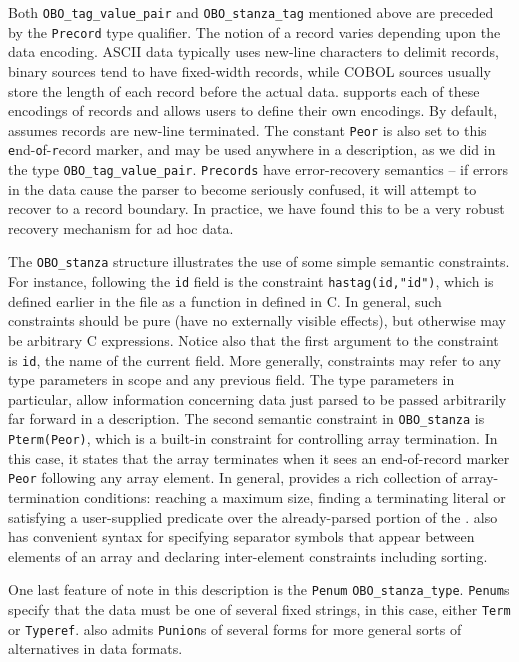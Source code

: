\documentclass[11pt]{article}
\begin{document}
Both \texttt{OBO\_tag\_value\_pair} and
\texttt{OBO\_stanza\_tag} mentioned above are preceded by the
\texttt{Precord} type qualifier.  
The notion of a record varies depending upon the data encoding.  
ASCII data typically uses new-line characters to delimit 
records, binary sources tend to have fixed-width records, while 
COBOL sources usually store the length of each record before the actual data.
\pads{} supports each of these encodings of records and allows users to define
their own encodings.  By default, \pads{} assumes records are new-line terminated.  The constant \texttt{Peor} is also set to this
\texttt{e}nd-\texttt{o}f-\texttt{r}ecord marker, and may be used anywhere in a
description, as we did in the
type \texttt{OBO\_tag\_value\_pair}.
\texttt{Precords} have error-recovery semantics -- if errors 
in the data cause the parser to become seriously confused,
it will attempt to recover to a record boundary.
In practice, we have found this to be a very robust recovery mechanism
for ad hoc data.  

The \texttt{OBO\_stanza} structure 
illustrates the use of some simple semantic constraints.
For instance, following the \texttt{id} field is the constraint
\texttt{hastag(id,"id")}, which is defined earlier in the file
as a function in defined in C.  In general, such constraints should
be pure (have no externally visible effects), but otherwise may be
arbitrary C expressions.  Notice also that the first argument to the constraint
is \texttt{id}, the name of the current field.  More generally,
constraints may refer to any type parameters in scope and any previous field.
The type parameters in particular, allow information concerning data
just parsed to be passed arbitrarily far forward in a description.
The second semantic constraint in \texttt{OBO\_stanza} is
\texttt{Pterm(Peor)}, which is a built-in constraint for 
controlling array termination.  In this case, it states that
the array terminates when it sees an end-of-record marker 
\texttt{Peor} following any array element.  
In general, \pads{} provides a rich collection
of array-termination conditions: reaching a maximum size, finding 
a terminating literal 
or satisfying a user-supplied predicate over the already-parsed portion of 
the .  \pads{} also has convenient syntax for 
specifying separator symbols that
appear between elements of an array and declaring inter-element
constraints including sorting.

One last feature of note in this description is the \texttt{Penum}
\texttt{OBO\_stanza\_type}.  \texttt{Penum}s specify that
the data must be one of several fixed strings, in this case, 
either \texttt{Term} or \texttt{Typeref}.  \pads{} also admits
\texttt{Punion}s of several forms for more general sorts of alternatives
in data formats.
\end{document}
